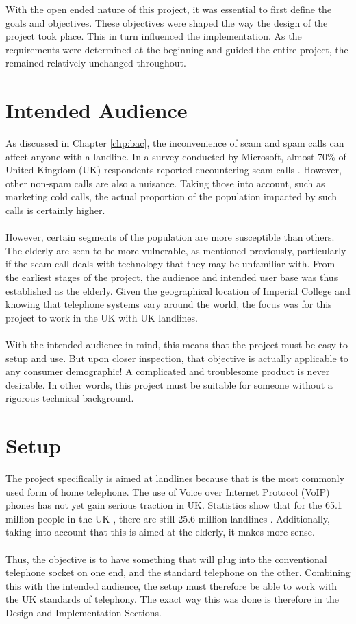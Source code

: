\documentclass[main.tex]{subfiles}
\begin{document}
With the open ended nature of this project, it was essential to first define the goals and objectives. These objectives were shaped the way the design of the project took place. This in turn influenced the implementation. As the requirements were determined at the beginning and guided the entire project, the remained relatively unchanged throughout.

\section{Intended Audience}
As discussed in Chapter \ref{chp:bac}, the inconvenience of scam and spam calls can affect anyone with a landline. In a survey conducted by Microsoft, almost 70\% of United Kingdom (UK) respondents reported encountering scam calls \cite{microsoft-survey}. However, other non-spam calls are also a nuisance. Taking those into account, such as marketing cold calls, the actual proportion of the population impacted by such calls is certainly higher.
\\\\
However, certain segments of the population are more susceptible than others. The elderly are seen to be more vulnerable, as mentioned previously, particularly if the scam call deals with technology that they may be unfamiliar with. From the earliest stages of the project, the audience and intended user base was thus established as the elderly. Given the geographical location of Imperial College and knowing that telephone systems vary around the world, the focus was for this project to work in the UK with UK landlines.
\\\\
With the intended audience in mind, this means that the project must be easy to setup and use. But upon closer inspection, that objective is actually applicable to any consumer demographic! A complicated and troublesome product is never desirable. In other words, this project must be suitable for someone without a rigorous technical background.

\section{Setup}
The project specifically is aimed at landlines because that is the most commonly used form of home telephone. The use of Voice over Internet Protocol (VoIP) phones has not yet gain serious traction in UK. Statistics show that for the 65.1 million people in the UK \cite{ons}, there are still 25.6 million landlines \cite{ofcom}. Additionally, taking into account that this is aimed at the elderly, it makes more sense.
\\\\
Thus, the objective is to have something that will plug into the conventional telephone socket on one end, and the standard telephone on the other. Combining this with the intended audience, the setup must therefore be able to work with the UK standards of telephony. The exact way this was done is therefore in the Design and Implementation Sections.
\end{document}
